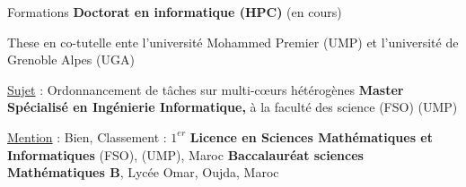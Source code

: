 \begin{rubric}{Formations}
    \textbf{Doctorat en informatique (HPC)} (en cours) \par
    These en co-tutelle ente l'université Mohammed Premier (UMP) et l'université de Grenoble Alpes (UGA)
    \par \underline{Sujet} : Ordonnancement de tâches sur multi-cœurs hétérogènes
%
    \vspace{1mm}
\entry*[$2014$]%
    \textbf{Master Spécialisé en Ingénierie Informatique,} à la faculté des science (FSO) (UMP)\par
    \underline{Mention} : Bien, Classement : $1^{er}$%
%
    \vspace{1mm}
\entry*[$2012$]%
    \textbf{Licence en Sciences Mathématiques et Informatiques} (FSO), (UMP), Maroc
%
%
    \vspace{1mm}
\entry*[$2008$]%
    \textbf{Baccalauréat sciences Mathématiques B}, Lycée Omar, Oujda, Maroc
\end{rubric}
